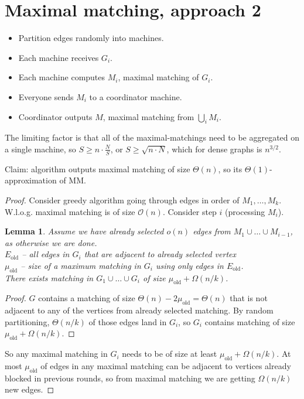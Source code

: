 \documentclass[11pt]{article}
\newtheorem{lemma}[theorem]{Lemma}
\newcommand{\bigo}{\mathcal{O}}
\begin{document}
\section{Maximal matching, approach 2}
\begin{itemize}
\item Partition edges randomly into machines. 
\item Each machine receives $G_i$.
\item Each machine computes $M_i$, maximal matching of $G_i$.
\item Everyone sends $M_i$ to a coordinator machine.
\item Coordinator outputs $M$, maximal matching from $\bigcup_i M_i$.
\end{itemize}

The limiting factor is that all of the maximal-matchings need to be aggregated on a single machine, so $S \ge n \cdot \frac{N}{S}$, or $S \ge \sqrt{n \cdot N}$, which for dense graphs is $n^{3/2}$.

Claim: algorithm outputs maximal matching of size $\Theta(n)$, so its $\Theta(1)$-approximation of MM.

\begin{proof}
Consider greedy algorithm going through edges in order of $M_1,\ldots,M_k$. W.l.o.g. maximal matching is of size $\bigo(n)$. Consider step $i$ (processing $M_i$). 

\begin{lemma}
Assume we have already selected $o(n)$ edges from $M_1 \cup \ldots \cup M_{i-1}$, as otherwise we are done.\\
$E_{\text{old}}$ -- all edges in $G_i$ that are adjacent to already selected vertex\\
$\mu_{\text{old}}$ -- size of a maximum matching in $G_i$ using only edges in $E_{\text{old}}$.\\
There exists matching in $G_1 \cup \ldots \cup G_{i}$ of size $\mu_{\text{old}} + \Omega(n/k)$.
\end{lemma}
\begin{proof}
$G$ contains a matching of size $\Theta(n) - 2 \mu_{\text{old}} = \Theta(n)$ that is not adjacent to any of the vertices from already selected matching. By random partitioning, $\Theta(n/k)$ of those edges land in $G_i$, so $G_i$ contains matching of size $\mu_{\text{old}} + \Omega(n/k)$.
\end{proof}


So any maximal matching in $G_i$ needs to be of size at least $\mu_{\text{old}} + \Omega(n/k)$. At most $\mu_{\text{old}}$ of edges in any maximal matching can be adjacent to vertices already blocked in previous rounds, so from maximal matching we are getting $\Omega(n/k)$ new edges.
\end{proof}



\end{document}
